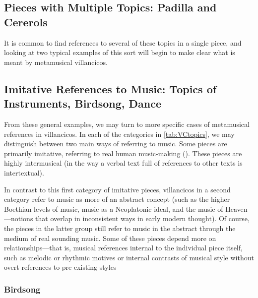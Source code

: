 \subsection{%
Pieces with Multiple Topics: Padilla and Cererols
}


It is common to find references to several of these topics in a single piece, and looking at two typical examples of this sort will begin to make clear what is meant by metamusical villancicos.
\subsection{%
Imitative References to Music: Topics of Instruments, Birdsong, Dance
}
From these general examples, we may turn to more specific cases of metamusical references in villancicos.
In each of the categories in \cref{tab:VCtopics}, we may distinguish between two main ways of referring to music.
Some pieces are primarily imitative, referring to real human music-making ().
These pieces are highly intermusical (in the way a verbal text full of references to other texts is intertextual).

In contrast to this first category of imitative pieces, villancicos in a second category refer to music as more of an abstract concept (such as the higher Boethian levels of music, music as a Neoplatonic ideal, and the music of Heaven---notions that overlap in inconsistent ways in early modern thought).
Of course, the pieces in the latter group still refer to music in the abstract through the medium of real sounding music.
Some of these pieces depend more on  relationships---that is, musical references internal to the individual piece itself, such as melodic or rhythmic motives or internal contrasts of musical style without overt references to pre-existing styles 


\subsubsection{Birdsong}

